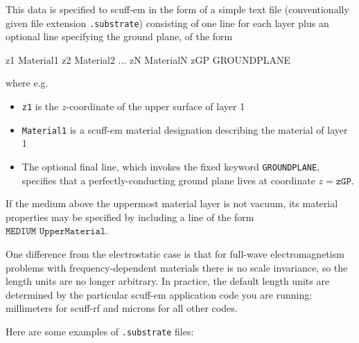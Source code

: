 \documentclass[letterpaper]{article}
\begin{document}
This data is specified to {\sc scuff-em} in the
form of a simple text file (conventionally given file
extension \texttt{.substrate}) consisting of one line for each
layer plus an optional line specifying the ground
plane, of the form

\medskip

\begin{verbcode}
z1  Material1
z2  Material2
...
zN  MaterialN
zGP GROUNDPLANE
\end{verbcode}

\medskip

where e.g.
\begin{itemize}
 \item \texttt{z1} is the $z$-coordinate of the upper surface of
       layer 1
 \item \texttt{Material1} is a {\sc scuff-em} material designation
       describing the material of layer 1
 \item The optional 
       final line, which invokes the fixed keyword \texttt{GROUNDPLANE},
       specifies that a perfectly-conducting ground plane lives at 
       coordinate $z=\texttt{zGP}$.
\end{itemize}
If the medium above the uppermost material layer is not vacuum,
its material properties may be specified by including a line of the form
$\texttt{MEDIUM UpperMaterial}.$

One difference from the electrostatic case is that for full-wave
electromagnetism problems with frequency-dependent materials
there is no scale invariance, so the length units are no longer
arbitrary. In practice, the default length units are determined
by the particular {\sc scuff-em} application code you are running:
millimeters for {\sc scuff-rf} and microns for all other codes.

Here are some examples of \texttt{.substrate} files:
\end{document}
